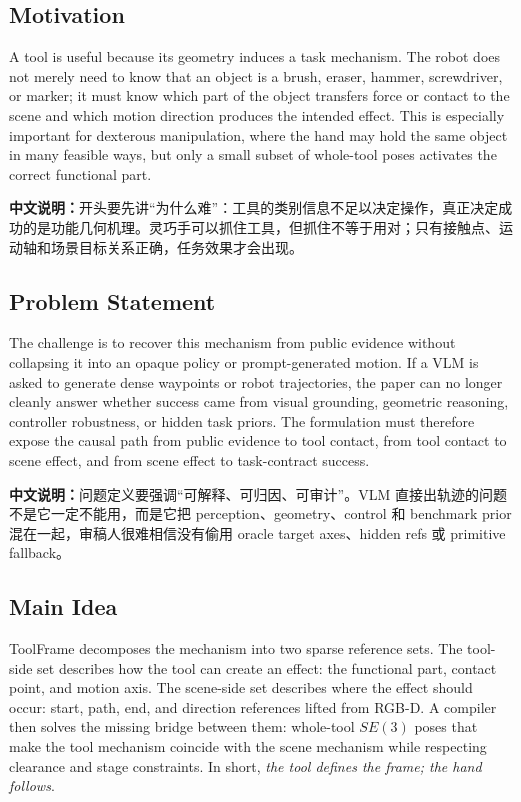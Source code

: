\documentclass[journal]{IEEEtran}
\newcommand{\method}{ToolFrame}
\newcommand{\cn}[1]{\par\smallskip\noindent\textbf{中文说明：}#1\par\smallskip}
\begin{document}
\subsection{Motivation}
A tool is useful because its geometry induces a task mechanism. The robot does
not merely need to know that an object is a brush, eraser, hammer,
screwdriver, or marker; it must know which part of the object transfers force
or contact to the scene and which motion direction produces the intended
effect. This is especially important for dexterous manipulation, where the hand
may hold the same object in many feasible ways, but only a small subset of
whole-tool poses activates the correct functional part.

\cn{开头要先讲“为什么难”：工具的类别信息不足以决定操作，真正决定成功的是功能几何机理。灵巧手可以抓住工具，但抓住不等于用对；只有接触点、运动轴和场景目标关系正确，任务效果才会出现。}

\subsection{Problem Statement}
The challenge is to recover this mechanism from public evidence without
collapsing it into an opaque policy or prompt-generated motion. If a VLM is
asked to generate dense waypoints or robot trajectories, the paper can no
longer cleanly answer whether success came from visual grounding, geometric
reasoning, controller robustness, or hidden task priors. The formulation must
therefore expose the causal path from public evidence to tool contact, from
tool contact to scene effect, and from scene effect to task-contract success.

\cn{问题定义要强调“可解释、可归因、可审计”。VLM 直接出轨迹的问题不是它一定不能用，而是它把 perception、geometry、control 和 benchmark prior 混在一起，审稿人很难相信没有偷用 oracle target axes、hidden refs 或 primitive fallback。}

\subsection{Main Idea}
\method{} decomposes the mechanism into two sparse reference sets. The
tool-side set describes how the tool can create an effect: the functional part,
contact point, and motion axis. The scene-side set describes where the effect
should occur: start, path, end, and direction references lifted from RGB-D. A
compiler then solves the missing bridge between them: whole-tool $SE(3)$ poses
that make the tool mechanism coincide with the scene mechanism while respecting
clearance and stage constraints. In short, \emph{the tool defines the frame;
the hand follows}.
\end{document}
